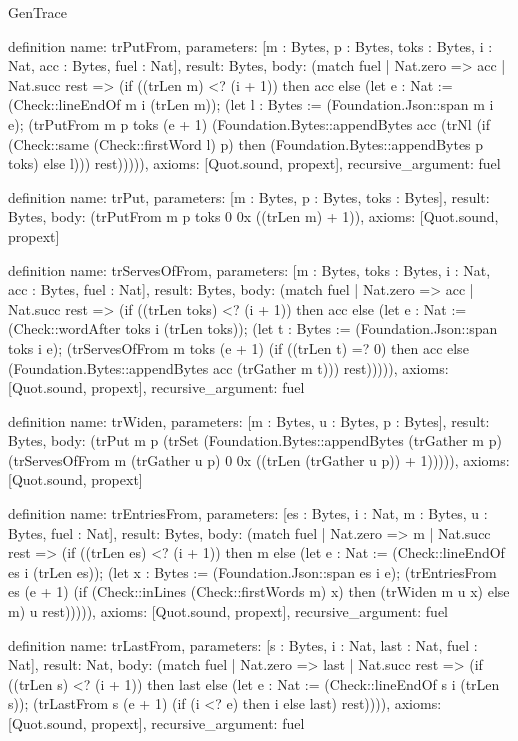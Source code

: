 \begin{lexlean}{GenTrace}
\begin{semanticmodule}
definition{
  name: trPutFrom,
  parameters: [m : Bytes, p : Bytes, toks : Bytes, i : Nat, acc : Bytes, fuel : Nat],
  result: Bytes,
  body: (match fuel
    | Nat.zero => acc
    | Nat.succ rest => (if ((trLen m) <? (i + 1)) then acc else (let e : Nat := (Check::lineEndOf m i (trLen m)); (let l : Bytes := (Foundation.Json::span m i e); (trPutFrom m p toks (e + 1) (Foundation.Bytes::appendBytes acc (trNl (if (Check::same (Check::firstWord l) p) then (Foundation.Bytes::appendBytes p toks) else l))) rest))))),
  axioms: [Quot.sound, propext],
  recursive_argument: fuel
}

definition{
  name: trPut,
  parameters: [m : Bytes, p : Bytes, toks : Bytes],
  result: Bytes,
  body: (trPutFrom m p toks 0 0x ((trLen m) + 1)),
  axioms: [Quot.sound, propext]
}

definition{
  name: trServesOfFrom,
  parameters: [m : Bytes, toks : Bytes, i : Nat, acc : Bytes, fuel : Nat],
  result: Bytes,
  body: (match fuel
    | Nat.zero => acc
    | Nat.succ rest => (if ((trLen toks) <? (i + 1)) then acc else (let e : Nat := (Check::wordAfter toks i (trLen toks)); (let t : Bytes := (Foundation.Json::span toks i e); (trServesOfFrom m toks (e + 1) (if ((trLen t) =? 0) then acc else (Foundation.Bytes::appendBytes acc (trGather m t))) rest))))),
  axioms: [Quot.sound, propext],
  recursive_argument: fuel
}

definition{
  name: trWiden,
  parameters: [m : Bytes, u : Bytes, p : Bytes],
  result: Bytes,
  body: (trPut m p (trSet (Foundation.Bytes::appendBytes (trGather m p) (trServesOfFrom m (trGather u p) 0 0x ((trLen (trGather u p)) + 1))))),
  axioms: [Quot.sound, propext]
}

definition{
  name: trEntriesFrom,
  parameters: [es : Bytes, i : Nat, m : Bytes, u : Bytes, fuel : Nat],
  result: Bytes,
  body: (match fuel
    | Nat.zero => m
    | Nat.succ rest => (if ((trLen es) <? (i + 1)) then m else (let e : Nat := (Check::lineEndOf es i (trLen es)); (let x : Bytes := (Foundation.Json::span es i e); (trEntriesFrom es (e + 1) (if (Check::inLines (Check::firstWords m) x) then (trWiden m u x) else m) u rest))))),
  axioms: [Quot.sound, propext],
  recursive_argument: fuel
}

definition{
  name: trLastFrom,
  parameters: [s : Bytes, i : Nat, last : Nat, fuel : Nat],
  result: Nat,
  body: (match fuel
    | Nat.zero => last
    | Nat.succ rest => (if ((trLen s) <? (i + 1)) then last else (let e : Nat := (Check::lineEndOf s i (trLen s)); (trLastFrom s (e + 1) (if (i <? e) then i else last) rest)))),
  axioms: [Quot.sound, propext],
  recursive_argument: fuel
}


\end{semanticmodule}
\end{lexlean}
